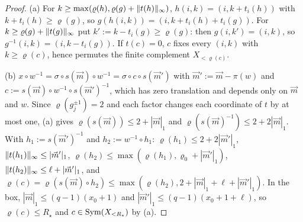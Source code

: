 \begin{proof}
(a) For $k\ge\max(\varrho(h),\varrho(g)+\lVert t(h)\rVert_\infty)$, $h(i,k)=(i,k+t_i(h))$ with $k+t_i(h)\ge\varrho(g)$, so $g(h(i,k))=(i,k+t_i(h)+t_i(g))$. For
$k\ge\varrho(g)+\lVert t(g)\rVert_\infty$ put $k':=k-t_i(g)\ge\varrho(g)$: then $g(i,k')=(i,k)$, so $g^{-1}(i,k)=(i,k-t_i(g))$. If $t(c)=0$, $c$ fixes every $(i,k)$ with $k\ge\varrho(c)$, hence
permutes the finite complement $X_{<\varrho(c)}$.

(b) $x\circ w^{-1}=\sigma\circ s(\vec m)\circ w^{-1}=\sigma\circ c\circ s(\vec m')$ with $\vec m':=\vec m-\pi(w)$ and $c:=s(\vec m)\circ w^{-1}\circ s(\vec m')^{-1}$, which has zero translation and
depends only on $\vec m$ and $w$. Since $\varrho(g_j^{\pm1})=2$ and each factor changes each coordinate of $t$ by at most one, (a) gives $\varrho(s(\vec m))\le2+|\vec m|_1$ and
$\varrho(s(\vec m)^{-1})\le2+2|\vec m|_1$. With $h_1:=s(\vec m')^{-1}$ and $h_2:=w^{-1}\circ h_1$: $\varrho(h_1)\le2+2|\vec m'|_1$, $\lVert t(h_1)\rVert_\infty\le|\vec m'|_1$,
$\varrho(h_2)\le\max(\varrho(h_1),\varrho_0+|\vec m'|_1)$, $\lVert t(h_2)\rVert_\infty\le\ell+|\vec m'|_1$, and $\varrho(c)=\varrho(s(\vec m)\circ h_2)\le\max(\varrho(h_2),2+|\vec m|_1+\ell+|\vec m'|_1)$. In
the box, $|\vec m|_1\le(q-1)(x_0+1)$ and $|\vec m'|_1\le(q-1)(x_0+1+\ell)$, so $\varrho(c)\le R_\star$ and $c\in\operatorname{Sym}(X_{<R_\star})$ by (a).
\end{proof}

